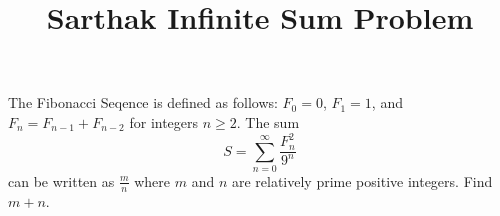 \documentclass[11pt]{scrartcl}
\title{Sarthak Infinite Sum Problem}
\begin{document}
The Fibonacci Seqence is defined as follows: $F_{0} = 0$, $F_{1} = 1$, and $F_{n} = F_{n - 1} + F_{n - 2}$ for integers $n \geq 2$. The sum
\[S = \sum_{n = 0}^{\infty} \frac{F_{n}^{2}}{9^{n}}\]
can be written as $\frac{m}{n}$ where $m$ and $n$ are relatively prime positive integers. Find $m + n$.
\end{document}
